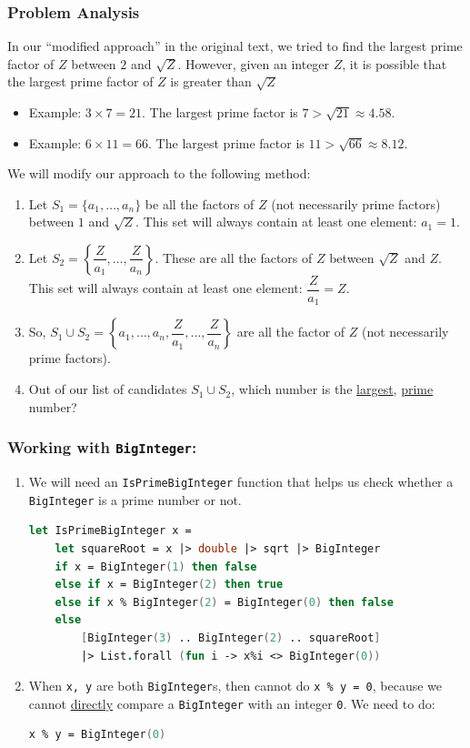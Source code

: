 \documentclass[12pt]{article}
\begin{document}
\subsubsection*{Problem Analysis}
In our ``modified approach'' in the original text, we tried to find the largest prime factor of $Z$ between $2$ and $\sqrt{Z}$. However, given an integer $Z$, it is possible that the largest prime factor of $Z$ is greater than $\sqrt{Z}$
\begin{itemize}
\item Example: $3 \times 7 = 21$. The largest prime factor is $7 > \sqrt{21} \approx 4.58$.

\item Example: $6 \times 11 = 66$. The largest prime factor is $11 > \sqrt{66} \approx 8.12$.
\end{itemize}
We will modify our approach to the following method:
\begin{enumerate}
\item Let $S_1 = \{a_1, \ldots, a_n\}$ be all the factors of $Z$ (not necessarily prime factors) between $1$ and $\sqrt{Z}$. This set will always contain at least one element: $a_1 = 1$.
\item Let $S_2 = \left\{\dfrac{Z}{a_1},\ldots, \dfrac{Z}{a_n}\right\}$. These are all the factors of $Z$ between $\sqrt{Z}$ and $Z$. This set will always contain at least one element: $\dfrac{Z}{a_1} = Z$.
\item So, $S_1 \cup S_2 =  \left\{a_1, \ldots, a_n, \dfrac{Z}{a_1},\ldots, \dfrac{Z}{a_n}\right\}$ are all the factor of $Z$ (not necessarily prime factors).
\item Out of our list of candidates $S_1 \cup S_2$, which number is the \underline{largest}, \underline{prime} number?
\end{enumerate}

\subsubsection*{Working with \texttt{BigInteger}:}
\begin{enumerate}
\item We will need an \texttt{IsPrimeBigInteger} function that helps us check whether a \texttt{BigInteger} is a prime number or not.
\begin{lstlisting}[language=FSharp]
let IsPrimeBigInteger x =
    let squareRoot = x |> double |> sqrt |> BigInteger 
    if x = BigInteger(1) then false
    else if x = BigInteger(2) then true
    else if x % BigInteger(2) = BigInteger(0) then false
    else 
        [BigInteger(3) .. BigInteger(2) .. squareRoot]
        |> List.forall (fun i -> x%i <> BigInteger(0))
\end{lstlisting}
\item When \texttt{x, y} are both \texttt{BigInteger}s, then cannot do \texttt{x \% y = 0}, because we cannot \underline{directly} compare a \texttt{BigInteger} with an integer \texttt{0}. We need to do:
\begin{lstlisting}[language=FSharp]
x % y = BigInteger(0)
\end{lstlisting}
\end{enumerate}
\end{document}
